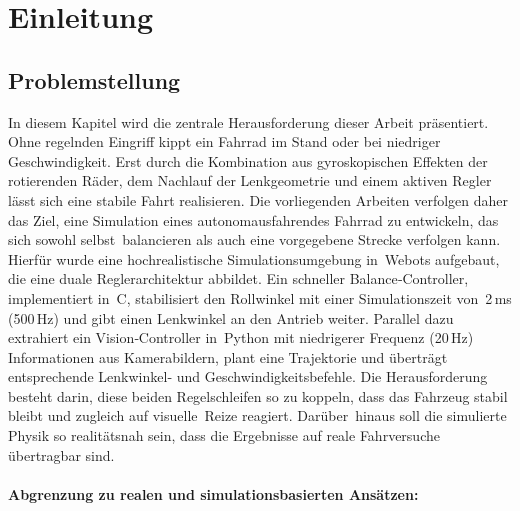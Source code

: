 
\section{Einleitung}

\subsection{Problemstellung}
In diesem Kapitel wird die zentrale Herausforderung dieser Arbeit präsentiert. 
Ohne regelnden Eingriff kippt ein Fahrrad im Stand oder bei niedriger Geschwindigkeit. Erst durch die Kombination 
aus gyroskopischen Effekten der rotierenden Räder, dem Nachlauf der Lenkgeometrie und einem aktiven Regler 
lässt sich eine stabile Fahrt realisieren. Die vorliegenden Arbeiten verfolgen daher das Ziel, eine 
Simulation eines autonomausfahrendes Fahrrad zu entwickeln, das sich sowohl selbst balancieren als auch eine vorgegebene Strecke verfolgen 
kann. Hierfür wurde eine hochrealistische Simulationsumgebung in Webots aufgebaut, die eine duale Reglerarchitektur 
abbildet. Ein schneller Balance‑Controller, implementiert in C, stabilisiert den Rollwinkel mit einer Simulationszeit 
von 2\,ms (500\,Hz) und gibt einen Lenkwinkel an den Antrieb weiter. Parallel dazu extrahiert ein Vision‑Controller 
in Python mit niedrigerer Frequenz (20\,Hz) Informationen aus Kamerabildern, plant eine Trajektorie und überträgt 
entsprechende Lenkwinkel‑ und Geschwindigkeitsbefehle. Die Herausforderung besteht darin, diese beiden Regelschleifen 
so zu koppeln, dass das Fahrzeug stabil bleibt und zugleich auf visuelle Reize reagiert. Darüber hinaus soll die 
simulierte Physik so realitätsnah sein, dass die Ergebnisse auf reale Fahrversuche übertragbar sind.

\paragraph{Abgrenzung zu realen und simulationsbasierten Ansätzen:}

